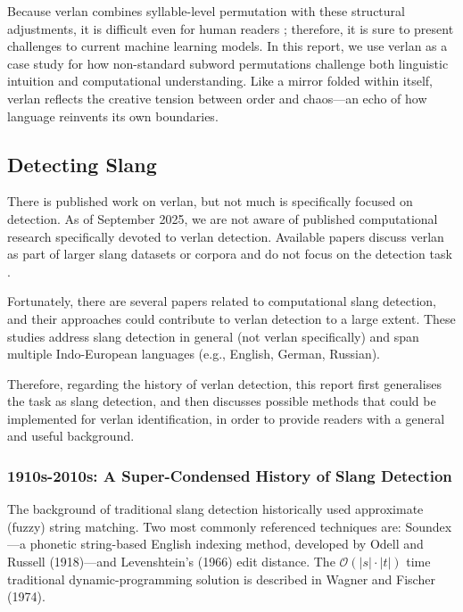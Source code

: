 \documentclass[12pt]{article}
\begin{document}
Because verlan combines syllable-level permutation with these structural adjustments, it is difficult even for human readers \cite{mela1991verlan}; therefore, it is sure to present challenges to current machine learning models. 
In this report, we use verlan as a case study for how non-standard subword permutations challenge both linguistic intuition and computational understanding. Like a mirror folded within itself, verlan reflects the creative tension between order and chaos\;---\;an echo of how language reinvents its own boundaries.

\subsection{Detecting Slang}

There is published work on verlan, but not much is specifically focused on detection. As of September 2025, we are not aware of published computational research specifically devoted to verlan detection. Available papers discuss verlan as part of larger slang datasets or corpora and do not focus on the detection task \cite{zurbuchen2024, podhorna2020rapcor, mekki2021tremolo, panckhurst202088milsms}.

Fortunately, there are several papers related to computational slang detection, and their approaches could contribute to verlan detection to a large extent\cite{pei2019slang, sun2024informal, slangornot2024, wu2018slangsd}. These studies address slang detection in general (not verlan specifically) and span multiple Indo-European languages (e.g., English, German, Russian).

Therefore, regarding the history of verlan detection, this report first generalises the task as slang detection, and then discusses possible methods that could be implemented for verlan identification, in order to provide readers with a general and useful background.

\subsubsection{1910s-2010s: A Super-Condensed History of Slang Detection}

The background of traditional slang detection historically used approximate (fuzzy) string matching. Two most commonly referenced techniques are: Soundex\;---\;a phonetic string-based English indexing method, developed by Odell and Russell (1918)\;---\;and Levenshtein's (1966) edit distance. The \( \mathcal{O}(|s|\cdot|t|) \) time traditional dynamic-programming solution is described in Wagner and Fischer (1974). \cite{russell1918soundex,levenshtein1966,wagner1974string}
\end{document}
